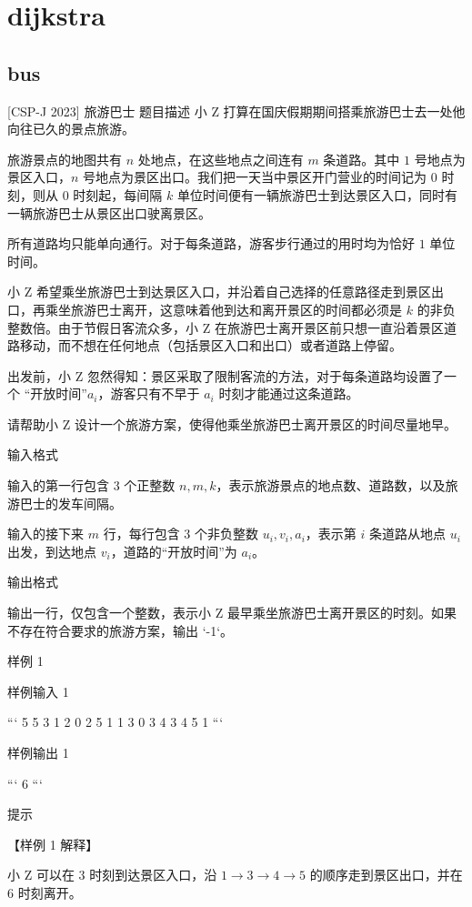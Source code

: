 \documentclass[12pt,twiside,a4paper]{ctexbook}
\numberwithin{chapter}{part}
\begin{document}
\chapter{dijkstra}
\section{bus}
 [CSP-J 2023] 旅游巴士
 题目描述
小 Z 打算在国庆假期期间搭乘旅游巴士去一处他向往已久的景点旅游。

旅游景点的地图共有 $n$ 处地点，在这些地点之间连有 $m$ 条道路。其中 $1$ 号地点为景区入口，$n$ 号地点为景区出口。我们把一天当中景区开门营业的时间记为 $0$ 时刻，则从 $0$ 时刻起，每间隔 $k$ 单位时间便有一辆旅游巴士到达景区入口，同时有一辆旅游巴士从景区出口驶离景区。

所有道路均只能单向通行。对于每条道路，游客步行通过的用时均为恰好 $1$ 单位时间。

小 Z 希望乘坐旅游巴士到达景区入口，并沿着自己选择的任意路径走到景区出口，再乘坐旅游巴士离开，这意味着他到达和离开景区的时间都必须是 $k$ 的非负整数倍。由于节假日客流众多，小 Z 在旅游巴士离开景区前只想一直沿着景区道路移动，而不想在任何地点（包括景区入口和出口）或者道路上停留。

出发前，小 Z 忽然得知：景区采取了限制客流的方法，对于每条道路均设置了一个
“开放时间”$a _ i$，游客只有不早于 $a _ i$ 时刻才能通过这条道路。

请帮助小 Z 设计一个旅游方案，使得他乘坐旅游巴士离开景区的时间尽量地早。

 输入格式

输入的第一行包含 3 个正整数 $n, m, k$，表示旅游景点的地点数、道路数，以及旅游巴士的发车间隔。

输入的接下来 $m$ 行，每行包含 3 个非负整数 $u _ i, v _ i, a_ i$，表示第 $i$ 条道路从地点 $u _ i$ 出发，到达地点 $v _ i$，道路的“开放时间”为 $a _ i$。

 输出格式

输出一行，仅包含一个整数，表示小 Z 最早乘坐旅游巴士离开景区的时刻。如果不存在符合要求的旅游方案，输出 `-1`。

 样例 1

 样例输入 1

```
5 5 3
1 2 0
2 5 1
1 3 0
3 4 3
4 5 1
```

 样例输出 1

```
6
```

 提示

【样例 1 解释】

小 Z 可以在 $3$ 时刻到达景区入口，沿 $1 \to 3 \to 4 \to 5$ 的顺序走到景区出口，并在 $6$ 时刻离开。
\end{document}
